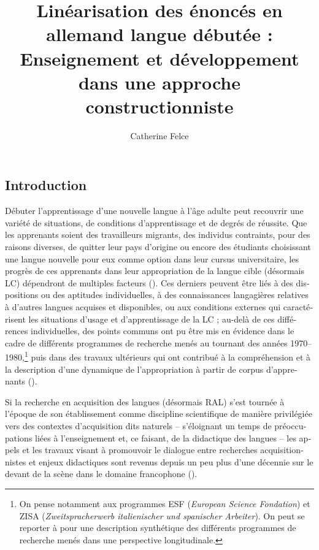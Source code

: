 \documentclass[output=paper]{langscibook}
\author{Catherine Felce\affiliation{Laboratoire Lidilem, Université Grenoble Alpes}}
\title[Linéarisation des énoncés en allemand langue débutée]{Linéarisation des énoncés en allemand langue débutée : Enseignement et développement dans une approche constructionniste}
\begin{document}
\begin{otherlanguage}{french}
\AffiliationsWithoutIndexing{}
\lsFrenchChapterSettings{}
\maketitle 

\section{Introduction}\label{sec:felce:1}

Débuter l’apprentissage d’une nouvelle langue à l’âge adulte peut recouvrir une variété de situations, de conditions d’apprentissage et de degrés de réussite. Que les apprenants soient des travailleurs migrants, des individus contraints, pour des raisons diverses, de quitter leur pays d’origine ou encore des étudiants choisissant une langue nouvelle pour eux comme option dans leur cursus universitaire, les progrès de ces apprenants dans leur appropriation de la langue cible (désormais LC) dépendront de multiples facteurs (\citealt{Dörnyei2009psychology, DörnyeiRyan2015}). Ces derniers peuvent être liés à des dispositions ou des aptitudes individuelles, à des connaissances langagières relatives à d’autres langues acquises et disponibles, ou aux conditions externes qui caractérisent les situations d’usage et d’apprentissage de la LC ; au-delà de ces différences individuelles, des points communs ont pu être mis en évidence dans le cadre de différents programmes de recherche menés au tournant des années 1970–1980,\footnote{On pense notamment aux programmes ESF (\textit{European Science Fondation}) et ZISA (\textit{Zweit\-sprach\-er\-werb italienischer und spanischer Arbeiter}). On peut se reporter à \citet[43--51]{Véronique2009} pour une description synthétique des différents programmes de recherche menés dans une perspective longitudinale.} puis dans des travaux ultérieurs qui ont contribué à la compréhension et à la description d’une dynamique de l’appropriation à partir de corpus d’apprenants (\citealt{BartningSchlyter2004, Myles2008}).

Si la recherche en acquisition des langues (désormais RAL) s’est tournée à l’époque de son établissement comme discipline scientifique de manière privilégiée vers des contextes d’acquisition dits naturels –  s’éloignant un temps de préoccupations liées à l’enseignement et, ce faisant, de la didactique des langues \citep{Véronique2005Interrelations} – les appels et les travaux visant à promouvoir le dialogue entre recherches acquisitionnistes et enjeux didactiques sont revenus depuis un peu plus d’une décennie sur le devant de la scène dans le domaine francophone (\citealt{Komur-ThilloyTrévisiol-Okamura2011, Véronique2017, WatorekEtAl2021eds}). 


\end{otherlanguage}
\end{document}
